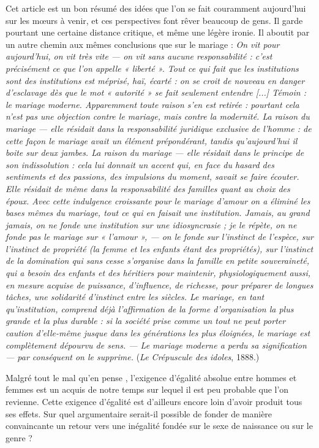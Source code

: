 Cet article est un bon résumé des idées que l'on se fait couramment aujourd'hui sur les mœurs à venir, et ces perspectives font rêver beaucoup de gens. Il garde pourtant une certaine distance critique, et même une légère ironie. Il aboutit par un autre chemin aux mêmes conclusions que  sur le mariage  : \emph{On vit pour aujourd'hui, on vit très vite --- on vit sans aucune responsabilité : c'est précisément ce que l'on appelle « liberté ». Tout ce qui fait que les institutions sont des institutions est méprisé, haï, écarté : on se croit de nouveau en danger d'esclavage dès que le mot « autorité » se fait seulement entendre \emph{[...]} Témoin : \emph{le mariage moderne}. Apparemment toute raison s'en est retirée : pourtant cela n'est pas une objection contre le mariage, mais contre la modernité. La raison du mariage --- elle résidait dans la responsabilité juridique exclusive de l'homme : de cette façon le mariage avait un élément prépondérant, tandis qu'aujourd'hui il boite sur deux jambes. La raison du mariage --- elle résidait dans le principe de son indissolution : cela lui donnait un accent qui, en face du hasard des sentiments et des passions, des impulsions du moment, \emph{savait se faire écouter}. Elle résidait de même dans la responsabilité des familles quant au choix des époux. Avec cette indulgence croissante pour le mariage \emph{d'amour} on a éliminé les bases mêmes du mariage, tout ce qui en faisait une institution. Jamais, au grand jamais, on ne fonde une institution sur une idiosyncrasie ; je le répète, on ne fonde pas le mariage sur « l'amour », --- on le fonde sur l'instinct de l'espèce, sur l'instinct de propriété (la femme et les enfants étant des propriétés), sur \emph{l'instinct de la domination} qui sans cesse s'organise dans la famille en petite souveraineté, qui a \emph{besoin} des enfants et des héritiers pour maintenir, physiologiquement aussi, en mesure acquise de puissance, d'influence, de richesse, pour préparer de longues tâches, une solidarité d'instinct entre les siècles. Le mariage, en tant qu'institution, comprend déjà l'affirmation de la forme d'organisation la plus grande et la plus durable : si la société prise comme un tout ne peut \emph{porter caution} d'elle-même jusque dans les générations les plus éloignées, le mariage est complètement dépourvu de sens. --- Le mariage moderne a perdu sa signification --- par conséquent on le supprime.}  (\emph{Le Crépuscule des idoles}, 1888.)

 Malgré tout le mal qu'en pense , l'exigence d'égalité absolue entre hommes et femmes est un acquis de notre temps sur lequel il est peu probable que l'on revienne. Cette exigence d'égalité est d'ailleurs encore loin d'avoir produit tous ses effets. Sur quel argumentaire serait-il possible de fonder de manière convaincante un retour vers une inégalité fondée sur le sexe de naissance ou sur le genre ?
 
